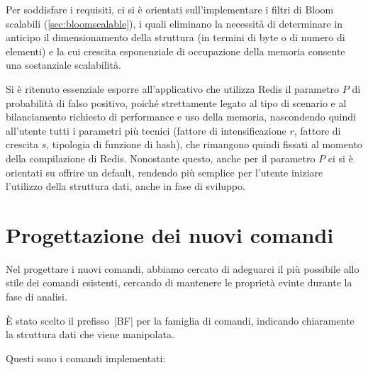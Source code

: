 Per soddisfare i requisiti, ci si è orientati sull'implementare i filtri di Bloom scalabili
(\autoref{sec:bloomscalable}), i quali eliminano la necessità di determinare in anticipo il
dimensionamento della struttura (in termini di byte o di numero di elementi) e la cui crescita
esponenziale di occupazione della memoria consente una sostanziale scalabilità.

Si è ritenuto essenziale esporre all'applicativo che utilizza Redis il parametro $P$ di probabilità
di falso positivo, poiché strettamente legato al tipo di scenario e al bilanciamento richiesto di
performance e uso della memoria, nascondendo quindi all'utente tutti i parametri più tecnici
(fattore di intensificazione $r$, fattore di crescita $s$, tipologia di funzione di hash), che
rimangono quindi fissati al momento della compilazione di Redis. Nonostante questo, anche per il
parametro $P$ ci si è orientati su offrire un default, rendendo più semplice per l'utente iniziare
l'utilizzo della struttura dati, anche in fase di sviluppo.

\section{Progettazione dei nuovi comandi}
\label{sec:patch:newcommands}

Nel progettare i nuovi comandi, abbiamo cercato di adeguarci il più possibile allo stile dei
comandi esistenti, cercando di mantenere le proprietà evinte durante la fase di analisi.

È stato scelto il prefisso~\cverb|BF| per la famiglia di comandi, indicando chiaramente la
struttura dati che viene manipolata.

Questi sono i comandi implementati:

